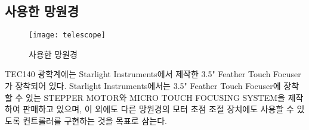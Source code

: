 \subsection{사용한 망원경}

\begin{wrapfigure}{l}{0.14\textwidth}
	\texttt{[image: telescope]}
	\caption{사용한 망원경}
	\label{fig:telescope}
\end{wrapfigure}
TEC140 광학계에는 Starlight Instruments에서 제작한 3.5" Feather Touch Focuser가 장착되어 있다. Starlight Instruments에서는 3.5" Feather Touch Focuser에 장착할 수 있는 STEPPER MOTOR와 MICRO TOUCH FOCUSING SYSTEM을 제작하여 판매하고 있으며, 이 외에도 다른 망원경의 모터 초점 조절 장치에도 사용할 수 있도록 컨트롤러를 구현하는 것을 목표로 삼는다.
